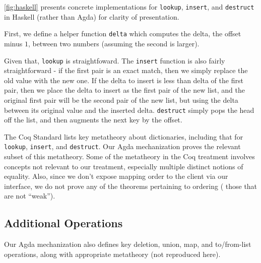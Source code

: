 \autoref{fig:haskell} presents concrete implementations for \texttt{lookup}, \texttt{insert}, and \texttt{destruct} in Haskell (rather than Agda) for clarity of presentation.
%

First, we define a helper function \verb+delta+ which computes the delta, \ie{} the offset minus $1$, between two numbers (assuming the second is larger).

Given that, \verb+lookup+ is straightfoward. The \verb+insert+ function is also fairly straightforward - if the first pair is an exact match, then we simply
%
replace the old value with the new one. If the delta to insert is less than delta of the first pair, then we place the delta to insert as the first pair of the new list, and
%
the original first pair will be the second pair of the new list, but using the delta between its original value and the inserted delta.
%
\verb+destruct+ simply pops the head off the list, and then augments the next key by the offset.

%
The Coq Standard \citet[Facts about weak maps]{FMapFacts} lists key metatheory about dictionaries, including that for \verb+lookup+, \verb+insert+, and \verb+destruct+.
%
Our Agda mechanization proves the relevant subset of this metatheory. Some of the metatheory in the Coq treatment involves concepts not relevant to our treatment,
%
especially multiple distinct notions of equality. Also, since we don't expose mapping order to the client via our interface,
%
we do not prove any of the theorems pertaining to ordering (\ie{} those that are not ``weak'').


\subsection{Additional Operations}

Our Agda mechanization also defines key deletion, union, map, and to/from-list operations, along
with appropriate metatheory (not reproduced here).



